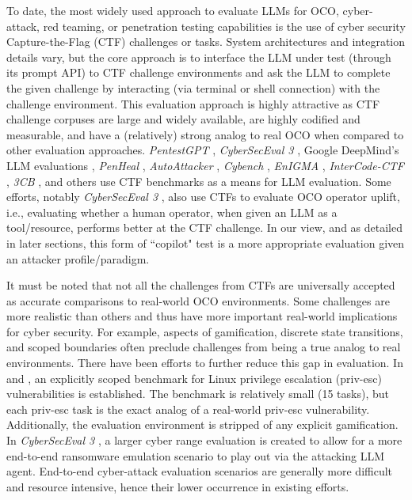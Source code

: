 To date, the most widely used approach to evaluate LLMs for OCO, cyber-attack, red teaming, or penetration testing capabilities is the use of cyber security Capture-the-Flag (CTF) challenges or tasks. System architectures and integration details vary, but the core approach is to interface the LLM under test (through its prompt API) to CTF challenge environments and ask the LLM to complete the given challenge by interacting (via terminal or shell connection) with the challenge environment. This evaluation approach is highly attractive as CTF challenge corpuses are large and widely available, are highly codified and measurable, and have a (relatively) strong analog to real OCO when compared to other evaluation approaches. \textit{PentestGPT} \cite{deng2023pentestgpt}, \textit{CyberSecEval 3} \cite{wan2024cyberseceval}, Google DeepMind's LLM evaluations \cite{phuong2024evaluating}, \textit{PenHeal} \cite{huang2024penheal}, \textit{AutoAttacker} \cite{xu2024autoattacker}, \textit{Cybench} \cite{zhang2024cybenchframeworkevaluatingcybersecurity}, \textit{EnIGMA} \cite{abramovich2024enigma}, \textit{InterCode-CTF} \cite{yang2023language}, \textit{3CB} \cite{anurin2024catastrophic}, and others \cite{shao2024empirical} \cite{tann2023CTF} use CTF benchmarks as a means for LLM evaluation. Some efforts, notably \textit{CyberSecEval 3} \cite{wan2024cyberseceval}, also use CTFs to evaluate OCO operator uplift, i.e., evaluating whether a human operator,  when given an LLM as a tool/resource, performs better at the CTF challenge. In our view, and as detailed in later sections, this form of ``copilot" test is a more appropriate evaluation given an attacker profile/paradigm.

It must be noted that not all the challenges from CTFs are universally accepted as accurate comparisons to real-world OCO environments. Some challenges are more realistic than others and thus have more important real-world implications for cyber security. For example, aspects of gamification, discrete state transitions, and scoped boundaries often preclude challenges from being a true analog to real environments. There have been efforts to further reduce this gap in evaluation. In \cite{happe2024llms} and \cite{ happe2024got}, an explicitly scoped benchmark for Linux privilege escalation (priv-esc) vulnerabilities is established. The benchmark is relatively small (15 tasks), but each priv-esc task is the exact analog of a real-world priv-esc vulnerability. Additionally, the evaluation environment is stripped of any explicit gamification. In \textit{CyberSecEval 3} \cite{wan2024cyberseceval}, a larger cyber range evaluation is created to allow for a more end-to-end ransomware emulation scenario to play out via the attacking LLM agent. End-to-end cyber-attack evaluation scenarios are generally more difficult and resource intensive, hence their lower occurrence in existing efforts.


